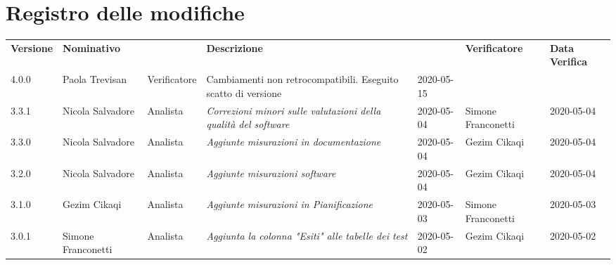 \section*{Registro delle modifiche}
\renewcommand{\arraystretch}{1.8}
 \setlength\LTleft{-1.7cm}
 \begin{longtable}{|p{1.7cm}|p{2cm}|p{2.5cm}|p{3cm}|p{1.7cm}|p{2cm}|p{2.3cm}|}
  \hline
  \rowcolor{header}
  \textbf{Versione} & \textbf{Nominativo} & \centering{\textbf{Ruolo}} & \textbf{Descrizione} &   \centering{\textbf{Data}} & \textbf{Verificatore} & \textbf{Data Verifica} \\
  
  4.0.0 & Paola Trevisan & Verificatore & Cambiamenti non retrocompatibili.  Eseguito scatto di versione & 2020-05-15 & &\\
  3.3.1 & Nicola Salvadore  & Analista & \small{\textit{Correzioni minori sulle valutazioni della qualità del software}} & 2020-05-04 & Simone Franconetti  & 2020-05-04 \\
  3.3.0 & Nicola Salvadore  & Analista & \small{\textit{Aggiunte misurazioni in documentazione}} & 2020-05-04 & Gezim Cikaqi  & 2020-05-04 \\
  3.2.0 & Nicola Salvadore  & Analista & \small{\textit{Aggiunte misurazioni software}} & 2020-05-04 & Gezim Cikaqi  & 2020-05-04 \\
  3.1.0 & Gezim Cikaqi  & Analista & \small{\textit{Aggiunte misurazioni in Pianificazione}} & 2020-05-03 & Simone Franconetti  & 2020-05-03 \\
  3.0.1 & Simone Franconetti & Analista & \small{\textit{Aggiunta la colonna "Esiti" alle tabelle dei test}} & 2020-05-02 & Gezim Cikaqi  & 2020-05-02 \\
  

\end{longtable}
